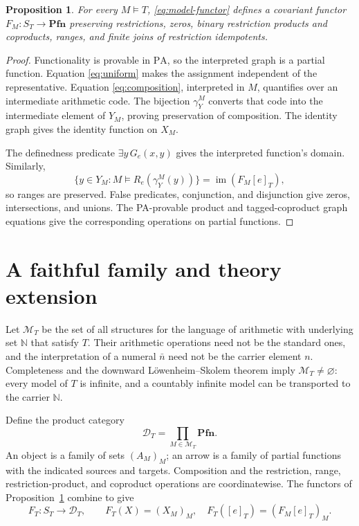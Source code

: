 \documentclass[11pt]{article}
\newtheorem{proposition}[theorem]{Proposition}
\newcommand{\N}{\mathbb N}
\newcommand{\PA}{\mathrm{PA}}
\newcommand{\Pfn}{\mathbf{Pfn}}
\begin{document}
\begin{proposition}\label{prop:model}
For every $M\models T$, \eqref{eq:model-functor} defines a covariant
functor $F_M:S_T\to\Pfn$ preserving restrictions, zeros, binary
restriction products and coproducts, ranges, and finite joins of
restriction idempotents.
\end{proposition}
\begin{proof}
Functionality is provable in $\PA$, so the interpreted graph is a
partial function. Equation \eqref{eq:uniform} makes the assignment
independent of the representative. Equation \eqref{eq:composition},
interpreted in $M$, quantifies over an intermediate arithmetic code.
The bijection $\gamma_Y^M$ converts that code into the intermediate
element of $Y_M$, proving preservation of composition. The identity
graph gives the identity function on $X_M$.

The definedness predicate $\exists y\,G_e(x,y)$ gives the interpreted
function's domain. Similarly,
\[
 \{y\in Y_M:M\models R_e(\gamma_Y^M(y))\}
 =\operatorname{im}(F_M[e]_T),
\]
so ranges are preserved. False predicates, conjunction, and disjunction
give zeros, intersections, and unions. The PA-provable product and
tagged-coproduct graph equations give the corresponding operations on
partial functions.
\end{proof}

\section{A faithful family and theory extension}\label{sec:family}

Let $\mathcal M_T$ be the set of all structures for the language of
arithmetic with underlying set $\N$ that satisfy $T$. Their arithmetic
operations need not be the standard ones, and the interpretation of a
numeral $\bar n$ need not be the carrier element $n$. Completeness and
the downward L\"owenheim--Skolem theorem imply
$\mathcal M_T\ne\varnothing$: every model of $T$ is infinite, and a
countably infinite model can be transported to the carrier $\N$.

Define the product category
\[
 \mathcal D_T=\prod_{M\in\mathcal M_T}\Pfn.
\]
An object is a family of sets $(A_M)_M$; an arrow is a family of partial
functions with the indicated sources and targets. Composition and the
restriction, range, restriction-product, and coproduct operations are coordinatewise.
The functors of Proposition~\ref{prop:model} combine to give
\[
 F_T:S_T\longrightarrow\mathcal D_T,\qquad
 F_T(X)=(X_M)_M,\quad F_T([e]_T)=(F_M[e]_T)_M.
\]
\end{document}
